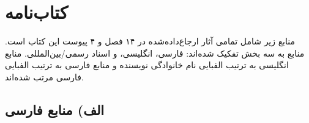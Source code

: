 
\chapter*{کتاب‌نامه}
\label{ch:bibliography}

\begin{tcolorbox}[mybox, title={درباره‌ی کتاب‌نامه}]
منابع زیر شامل تمامی آثار ارجاع‌داده‌شده در ۱۴ فصل و ۴ پیوست این کتاب است. منابع به سه بخش تفکیک شده‌اند: فارسی، انگلیسی، و اسناد رسمی/بین‌المللی. منابع انگلیسی به ترتیب الفبایی نام خانوادگی نویسنده و منابع فارسی به ترتیب الفبایی فارسی مرتب شده‌اند.
\end{tcolorbox}

\section*{الف) منابع فارسی}

